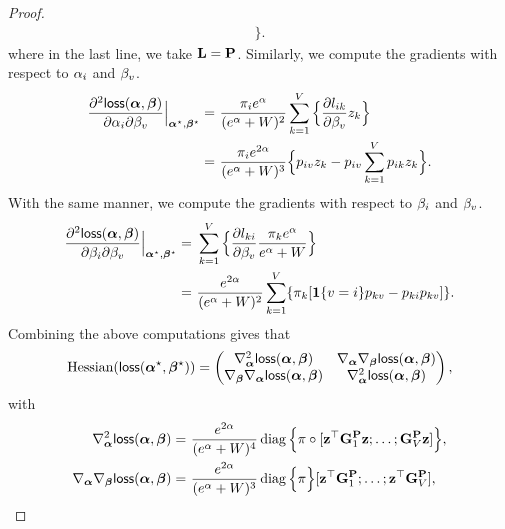 \begin{proof}
\begin{align*}
\Big\}.
\end{align*}
where in the last line, we take $\mathbf{L}=\mathbf{P}$. Similarly, we compute the gradients with respect to $\alpha_i$ and $\beta_v$.
\begin{align*}
\frac{\partial^2 \mathsf{loss}(\bm{\alpha}, \boldsymbol{\beta})}{\partial \alpha_i \partial \beta_v} \Big |_{\bm{\alpha}^\star,\boldsymbol{\beta}^\star} =  ~& \frac{\pi_i e^{\alpha}}{(e^{\alpha}+W)^2} 
\sum_{k=1}^V \Big\{\frac{\partial l_{ik}}{\partial \beta_v} z_k
\Big\}\\
=  ~& \frac{\pi_i e^{2\alpha}}{(e^{\alpha}+W)^3} 
\Big\{ p_{iv} z_k - p_{iv} \sum_{k=1}^V  p_{ik}z_k
\Big\}.
\end{align*}
With the same manner, we compute the gradients with respect to $\beta_i$ and $\beta_v$.
\begin{align*}
\frac{\partial^2 \mathsf{loss}(\bm{\alpha}, \boldsymbol{\beta})}{\partial \beta_i \partial \beta_v} \Big |_{\bm{\alpha}^\star,\boldsymbol{\beta}^\star} =  ~& \sum_{k=1}^V \Big\{\frac{\partial l_{ki}}{\partial \beta_v}\frac{\pi_k e^{\alpha}}{e^{\alpha}+W}\Big\}\\
= ~& \frac{e^{2\alpha}}{(e^\alpha+W)^2}\sum_{k=1}^V \{ \pi_k [\bm{1}\{v=i\} p_{kv} - p_{ki}p_{kv}] \}.
\end{align*}
Combining the above computations gives that
\begin{align*}
\text{Hessian}(\mathsf{loss}(\bm{\alpha}^\star, \boldsymbol{\beta}^\star)) = \left(\begin{matrix}
\nabla^2_{\bm{\alpha}} \mathsf{loss}(\bm{\alpha},\boldsymbol{\beta}) & \nabla_{\bm{\alpha}} \nabla_{\boldsymbol{\beta}}  \mathsf{loss}(\bm{\alpha},\boldsymbol{\beta})\\
\nabla_{\boldsymbol{\beta}} \nabla_{\bm{\alpha}} \mathsf{loss}(\bm{\alpha},\boldsymbol{\beta}) & \nabla^2_{\bm{\alpha}} \mathsf{loss}(\bm{\alpha},\boldsymbol{\beta})\\
\end{matrix}\right),
\end{align*}
with
\begin{align*}
\nabla^2_{\vecsink} \loss(\vecsink,\vecvalue) = &~ \frac{e^{2\sink}}{(e^\sink+W)^4}\diag\Big\{ \stable \circ [\bz^\top \gppred^\Transition_1\bz;\ldots;\gppred^\Transition_\vocabsize \bz] \Big\},\\
\nabla_{\vecsink} \nabla_{\vecvalue} \loss(\vecsink,\vecvalue) = &~ \frac{e^{2\sink}}{(e^\sink+W)^3}\diag\Big\{ \stable \Big\} [ \bz^\top\gppred^\Transition_1;\ldots; \bz^\top\gppred^\Transition_\vocabsize] ,\\

\end{align*}
\end{proof}
